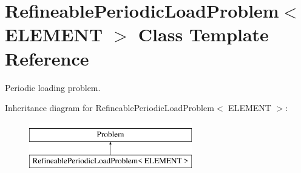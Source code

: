 \hypertarget{classRefineablePeriodicLoadProblem}{}\section{Refineable\+Periodic\+Load\+Problem$<$ E\+L\+E\+M\+E\+NT $>$ Class Template Reference}
\label{classRefineablePeriodicLoadProblem}


Periodic loading problem.  


Inheritance diagram for Refineable\+Periodic\+Load\+Problem$<$ E\+L\+E\+M\+E\+NT $>$\+:\begin{figure}[H]
\begin{center}
\leavevmode
\includegraphics[height=2.000000cm]{classRefineablePeriodicLoadProblem}
\end{center}
\end{figure}
